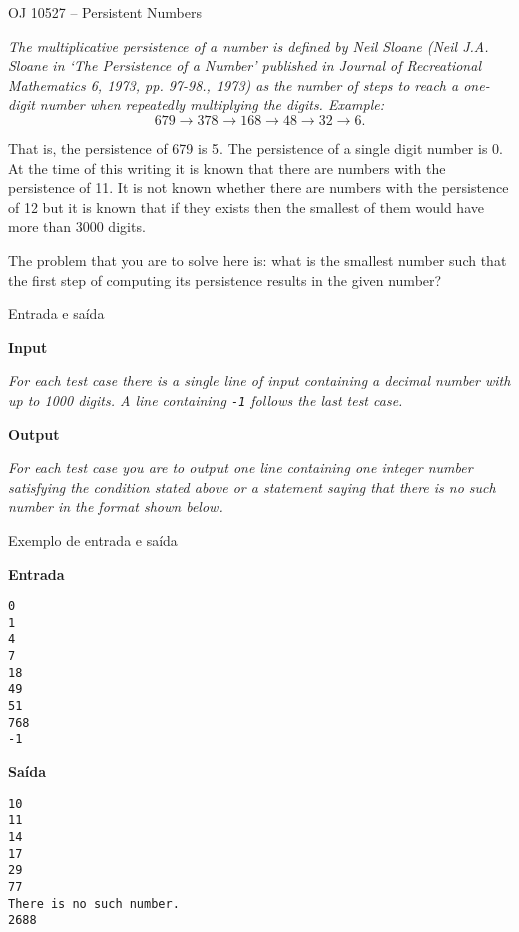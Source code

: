 \begin{frame}[fragile]{OJ 10527 -- Persistent Numbers}

{\it
The multiplicative persistence of a number is defined by Neil Sloane (Neil J.A. Sloane in `The
Persistence of a Number' published in Journal of Recreational Mathematics 6, 1973, pp. 97-98., 1973)
as the number of steps to reach a one-digit number when repeatedly multiplying the digits. Example:
\[
679 \to 378 \to 168 \to 48 \to 32 \to 6.
\]

That is, the persistence of 679 is 5. The persistence of a single digit number is 0. At the time of
this writing it is known that there are numbers with the persistence of 11. It is not known whether
there are numbers with the persistence of 12 but it is known that if they exists then the smallest of
them would have more than 3000 digits.

The problem that you are to solve here is: what is the smallest number such that the first step of
computing its persistence results in the given number?
}
\end{frame}

\begin{frame}[fragile]{Entrada e saída}

\textbf{Input}

{\it For each test case there is a single line of input containing a decimal number with up to 1000 digits. A
line containing \texttt{-1} follows the last test case.}

\vspace{0.3in}


\textbf{Output}

{\it For each test case you are to output one line containing one integer number satisfying the condition
stated above or a statement saying that there is no such number in the format shown below.}

\end{frame}

\begin{frame}[fragile]{Exemplo de entrada e saída}

\begin{minipage}[t]{0.45\textwidth}
\textbf{Entrada}
\begin{verbatim}
0
1
4
7
18
49
51
768
-1
\end{verbatim}
\end{minipage}
\begin{minipage}[t]{0.5\textwidth}
\textbf{Saída}
\begin{verbatim}
10
11
14
17
29
77
There is no such number.
2688
\end{verbatim}
\end{minipage}

\end{frame}


